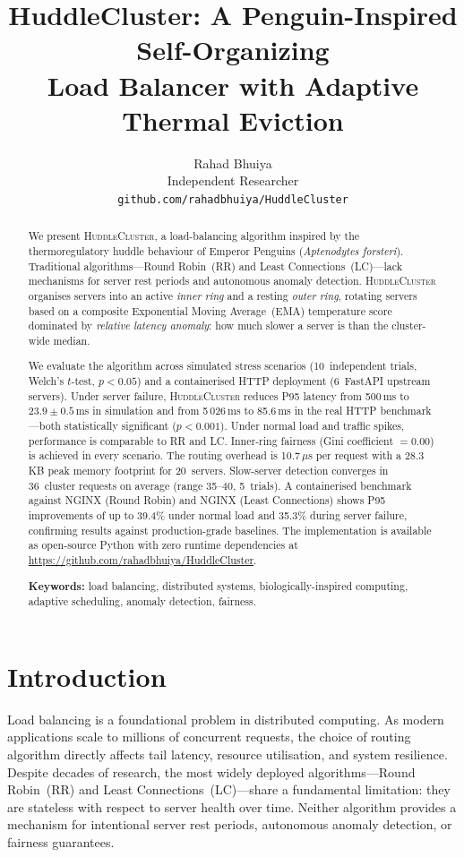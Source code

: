 \documentclass[10pt,twocolumn]{article}
\title{%
    \textbf{HuddleCluster: A Penguin-Inspired Self-Organizing}\\
    \textbf{Load Balancer with Adaptive Thermal Eviction}%
}
\author{%
    Rahad Bhuiya\\
    Independent Researcher\\
    \texttt{github.com/rahadbhuiya/HuddleCluster}%
}
\date{}
\begin{document}
\maketitle

\begin{abstract}
We present \textsc{HuddleCluster}, a load-balancing algorithm inspired by the
thermoregulatory huddle behaviour of Emperor Penguins
(\textit{Aptenodytes forsteri}).
Traditional algorithms---Round Robin~(RR) and Least Connections~(LC)---lack
mechanisms for server rest periods and autonomous anomaly detection.
\textsc{HuddleCluster} organises servers into an active \emph{inner ring} and
a resting \emph{outer ring}, rotating servers based on a composite
Exponential Moving Average~(EMA) temperature score dominated by
\emph{relative latency anomaly}: how much slower a server is than the
cluster-wide median.

We evaluate the algorithm across simulated stress scenarios
(10~independent trials, Welch's $t$-test, $p{<}0.05$) and a
containerised HTTP deployment (6~FastAPI upstream servers).
Under server failure, \textsc{HuddleCluster} reduces P95 latency from
500\,ms to $23.9 \pm 0.5$\,ms in simulation and from 5\,026\,ms to
85.6\,ms in the real HTTP benchmark---both statistically significant
($p{<}0.001$).
Under normal load and traffic spikes, performance is comparable to RR
and LC\@.
Inner-ring fairness (Gini coefficient $= 0.00$) is achieved in every
scenario.
The routing overhead is 10.7\,$\mu$s per request with a 28.3\,KB peak
memory footprint for 20~servers.
Slow-server detection converges in 36~cluster requests on average
(range 35--40, 5~trials).
A containerised benchmark against NGINX (Round Robin) and NGINX (Least
Connections) shows P95 improvements of up to 39.4\% under normal load
and 35.3\% during server failure, confirming results against
production-grade baselines.
The implementation is available as open-source Python with zero runtime
dependencies at
\url{https://github.com/rahadbhuiya/HuddleCluster}.

\textbf{Keywords:} load balancing, distributed systems,
biologically-inspired computing, adaptive scheduling, anomaly detection,
fairness.
\end{abstract}

\section{Introduction}
\label{sec:intro}

Load balancing is a foundational problem in distributed computing.
As modern applications scale to millions of concurrent requests, the
choice of routing algorithm directly affects tail latency, resource
utilisation, and system resilience.
Despite decades of research, the most widely deployed algorithms---Round
Robin~(RR) and Least Connections~(LC)---share a fundamental limitation:
they are stateless with respect to server health over time.
Neither algorithm provides a mechanism for intentional server rest
periods, autonomous anomaly detection, or fairness guarantees.
\end{document}
